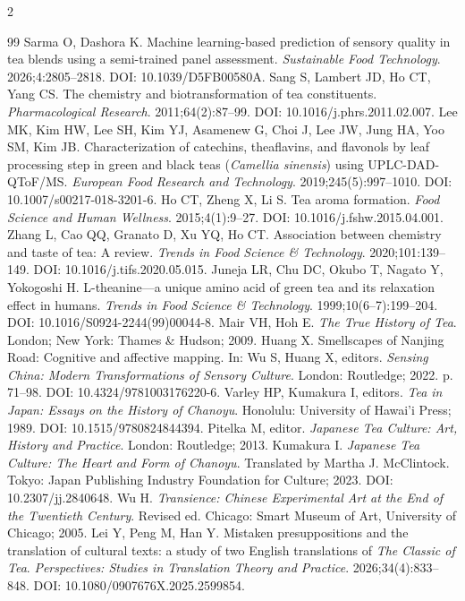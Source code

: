 \documentclass[numbers]{IntechOpen-Book}
\begin{document}
\begin{backmatter}
\begin{multicols}{2}
\begin{thebibliography}{99}
 Sarma O, Dashora K. Machine learning-based prediction of sensory quality in tea blends using a semi-trained panel assessment. \textit{Sustainable Food Technology}. 2026;4:2805--2818. DOI: 10.1039/D5FB00580A.
 Sang S, Lambert JD, Ho CT, Yang CS. The chemistry and biotransformation of tea constituents. \textit{Pharmacological Research}. 2011;64(2):87--99. DOI: 10.1016/j.phrs.2011.02.007.
 Lee MK, Kim HW, Lee SH, Kim YJ, Asamenew G, Choi J, Lee JW, Jung HA, Yoo SM, Kim JB. Characterization of catechins, theaflavins, and flavonols by leaf processing step in green and black teas (\textit{Camellia sinensis}) using UPLC-DAD-QToF/MS. \textit{European Food Research and Technology}. 2019;245(5):997--1010. DOI: 10.1007/s00217-018-3201-6.
 Ho CT, Zheng X, Li S. Tea aroma formation. \textit{Food Science and Human Wellness}. 2015;4(1):9--27. DOI: 10.1016/j.fshw.2015.04.001.
 Zhang L, Cao QQ, Granato D, Xu YQ, Ho CT. Association between chemistry and taste of tea: A review. \textit{Trends in Food Science \& Technology}. 2020;101:139--149. DOI: 10.1016/j.tifs.2020.05.015.
 Juneja LR, Chu DC, Okubo T, Nagato Y, Yokogoshi H. L-theanine---a unique amino acid of green tea and its relaxation effect in humans. \textit{Trends in Food Science \& Technology}. 1999;10(6--7):199--204. DOI: 10.1016/S0924-2244(99)00044-8.
 Mair VH, Hoh E. \textit{The True History of Tea}. London; New York: Thames \& Hudson; 2009.
 Huang X. Smellscapes of Nanjing Road: Cognitive and affective mapping. In: Wu S, Huang X, editors. \textit{Sensing China: Modern Transformations of Sensory Culture}. London: Routledge; 2022. p. 71--98. DOI: 10.4324/9781003176220-6.
 Varley HP, Kumakura I, editors. \textit{Tea in Japan: Essays on the History of Chanoyu}. Honolulu: University of Hawai'i Press; 1989. DOI: 10.1515/9780824844394.
 Pitelka M, editor. \textit{Japanese Tea Culture: Art, History and Practice}. London: Routledge; 2013.
 Kumakura I. \textit{Japanese Tea Culture: The Heart and Form of Chanoyu}. Translated by Martha J. McClintock. Tokyo: Japan Publishing Industry Foundation for Culture; 2023. DOI: 10.2307/jj.2840648.
 Wu H. \textit{Transience: Chinese Experimental Art at the End of the Twentieth Century}. Revised ed. Chicago: Smart Museum of Art, University of Chicago; 2005.
 Lei Y, Peng M, Han Y. Mistaken presuppositions and the translation of cultural texts: a study of two English translations of \textit{The Classic of Tea}. \textit{Perspectives: Studies in Translation Theory and Practice}. 2026;34(4):833--848. DOI: 10.1080/0907676X.2025.2599854.

\end{thebibliography}
\end{multicols}
\end{backmatter}
\end{document}
